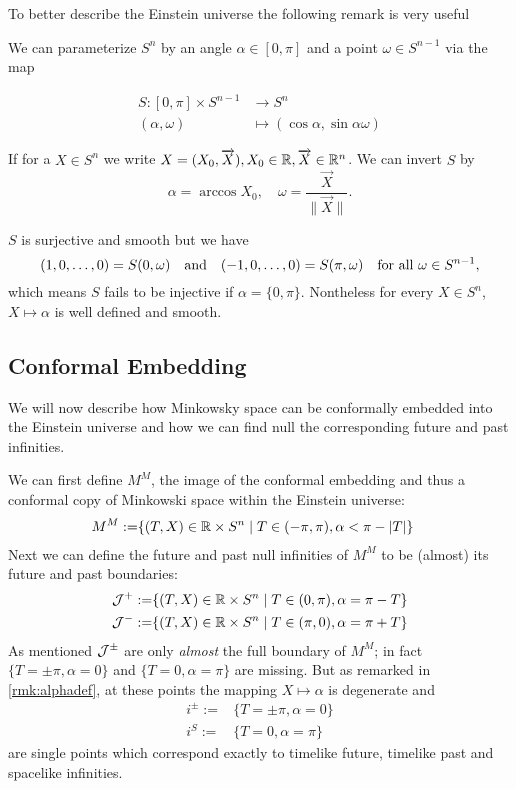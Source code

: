 To better describe the Einstein universe the following remark is very useful
\begin{remark}\label{rmk:alphadef}
We can parameterize $S^n$ by an angle $\alpha\in [0,\pi]$ and a point $\omega\in S^{n-1}$ via the map 

\begin{align*}
    S:[0,\pi]\times S^{n-1}&\to S^n \\
    (\alpha,\omega) &\mapsto (\cos \alpha, \sin \alpha \omega)
\end{align*}

If for a $X\in S^n$ we write $X=(X_0,\overrightarrow{X}), X_0\in \mathbb{R}, \overrightarrow{X}\in \mathbb{R}^n$. We can invert $S$ by 
\[
    \alpha = \arccos X_0, \quad \omega=\frac{\overrightarrow{X}}{\lVert\overrightarrow{X}\rVert}.
\]

$S$ is surjective and smooth but we have 
\[(1,0,\dots, 0) = S(0,\omega) \quad \text{and} \quad (-1,0,\dots,0)=S(\pi,\omega) \quad \text{for all }\omega\in {S^{n-1}},\]
which means $S$ fails to be injective if $\alpha = \{0,\pi\}$. Nontheless for every $X\in S^n$, $X\mapsto \alpha$ is well defined and smooth.
\end{remark}

\subsection{Conformal Embedding}
We will now describe how Minkowsky space can be conformally embedded into the Einstein universe and how we can find null the corresponding future and past infinities.
\begin{definition}
    We can first define $M^M$, the image of the conformal embedding and thus a conformal copy of Minkowski space within the Einstein universe:
    \begin{align*}
        M^M:=&\{(T,X)\in \mathbb{R}\times S^n \mid T\in(-\pi,\pi), \alpha<\pi-\lvert T\rvert\}
    \end{align*}
    Next we can define the future and past null infinities of $M^M$ to be (almost) its future and past boundaries:
    \begin{align*}
        {\mathcal{J}}^+:=&\{(T,X)\in \mathbb{R}\times S^n \mid T\in(0,\pi), \alpha = \pi - T\}\\
        {\mathcal{J}}^-:=&\{(T,X)\in \mathbb{R}\times S^n \mid T\in(\pi,0), \alpha = \pi + T\}
    \end{align*}
    As mentioned ${\mathcal{J}}^\pm$ are only \emph{almost} the full boundary of $M^M$; in fact $\{T=\pm\pi,\alpha=0\}$ and $\{T=0,\alpha=\pi\}$ are missing. But as remarked in \ref{rmk:alphadef}, at these points the mapping $X\mapsto \alpha$ is degenerate and 
    \begin{align*}
        i^\pm :=& \{T=\pm\pi,\alpha=0\} \\
        i^S := & \{T=0,\alpha=\pi\}
    \end{align*}
    are single points which correspond exactly to timelike future, timelike past and spacelike infinities.
\end{definition}

